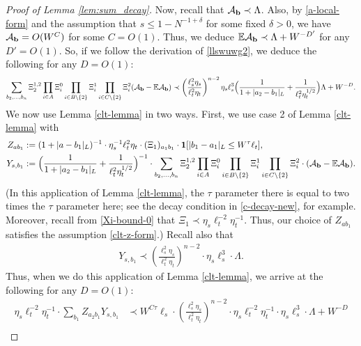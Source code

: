 \begin{proof}[Proof of Lemma \ref{lem:sum_decay}]
{%
Now, recall that ${\cal A}_{\textbf{b}}\prec \Lambda$. Also, by \eqref{a-local-form} and the assumption that $s\leq 1-N^{-1+\delta}$ for some fixed $\delta>0$, we have ${\cal A}_{\textbf{b}}=O(W^{C})$ for some $C=O(1)$. Thus, we deduce $\mathbb{E}{\cal A}_{\textbf{b}}\prec\Lambda +W^{-D'}$ for any $D'=O(1)$. So, if we follow the derivation of \eqref{llswuwg2}, we deduce the following for any $D=O(1)$:
%
\begin{align*}
\sum_{b_{2},\ldots,b_{n}}\Xi^{1,2}_{2}\prod_{i\in A}\Xi^{0}_{i}\prod_{i\in B\setminus\{2\}}\Xi^{1}_{i}\prod_{i\in C\setminus\{2\}}\Xi^{2}_{i} ({\cal A}_{\textbf{b}}-\mathbb{E}{\cal A}_{\textbf{b}})\prec \left(\frac{\ell_s^{2} \eta_s}{\ell_t^{2} \eta_t}\right)^{n-2} \eta_{s}\ell_{s}^{3}\Big(\frac{1}{1+|a_{2}-b_{1}|_{L}}+\frac{1}{\ell_{t}^{2}\eta_{t}^{1/2}}\Big)\Lambda + W^{-D}.
\end{align*}
%
We now use Lemma \ref{clt-lemma} in two ways. First, we use case 2 of Lemma \ref{clt-lemma} with
%
\begin{align*}
 Z_{ab_{1}}&:=(1+|a-b_{1}|_{L})^{-1}\cdot \eta_{s}^{-1}\ell_{t}^{2}\eta_{t} \cdot (\Xi_{1})_{a_{1}b_{1}}\cdot \mathbf{1}[|b_{1}-a_{1}|_{L}\leq W^{\tau}\ell_{t}],\\
 Y_{s,b_{1}}&:=\Big(\frac{1}{1+|a_{2}-b_{1}|_{L}}+\frac{1}{\ell_{t}^{2}\eta_{t}^{1/2}}\Big)^{-1}\cdot \sum_{b_{2},\ldots,b_{n}}\Xi^{1,2}_{2}\prod_{i\in A}\Xi^{0}_{i}\prod_{i\in B\setminus\{2\}}\Xi^{1}_{i}\prod_{i\in C\setminus\{2\}}\Xi^{2}_{i}\cdot ({\cal A}_{\textbf{b}}-\mathbb{E}{\cal A}_{\textbf{b}}).
\end{align*}
%
(In this application of Lemma \ref{clt-lemma}, the $\tau$ parameter there is equal to two times the $\tau$ parameter here; see the decay condition in \eqref{c-decay-new}, for example. Moreover, recall from \eqref{Xi-bound-0} that $\Xi_{1}\prec \eta_{s}\ell_{t}^{-2}\eta_{t}^{-1}$. Thus, our choice of $Z_{ab_{1}}$ satisfies the assumption \eqref{clt-z-form}.) Recall also that 
%
\begin{align*}
Y_{s,b_{1}}\prec \left(\frac{\ell_{s}^{2}\eta_{s}}{\ell_{t}^{2}\eta_{t}}\right)^{n-2}\cdot\eta_{s}\ell_{s}^{3}\cdot\Lambda.
\end{align*}
%
Thus, when we do this application of Lemma \ref{clt-lemma}, we arrive at the following for any $D=O(1)$:
%
\begin{align*}
\eta_{s}\ell_{t}^{-2}\eta_{t}^{-1}\cdot \sum_{b_{1}}Z_{a_{2}b_{1}}Y_{s,b_{1}}&\prec W^{C\tau}\ell_{s}\cdot \left(\frac{\ell_s^{2} \eta_s}{\ell_t^{2} \eta_t}\right)^{n-2} \cdot \eta_{s}\ell_{t}^{-2}\eta_{t}^{-1} \cdot \eta_{s}\ell_{s}^{3} \cdot \Lambda + W^{-D}\\

\end{align*}}
\end{proof}
